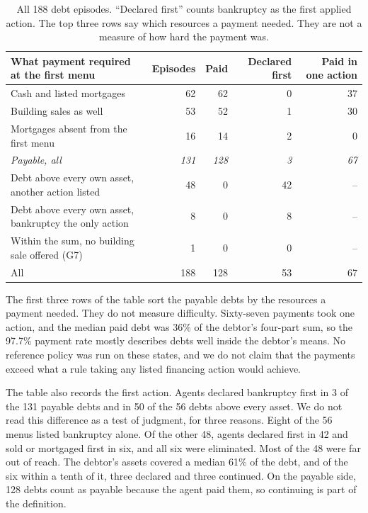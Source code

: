 \documentclass[11pt,letterpaper]{article}
\begin{document}
\begin{table}[htbp]\centering\small
\begin{tabularx}{\linewidth}{@{}Yrrrr@{}}\toprule
What payment required at the first menu & Episodes & Paid & Declared first & Paid in one action\\\midrule
Cash and listed mortgages & 62 & 62 & 0 & 37\\
Building sales as well & 53 & 52 & 1 & 30\\
Mortgages absent from the first menu & 16 & 14 & 2 & 0\\
\emph{Payable, all} & \emph{131} & \emph{128} & \emph{3} & \emph{67}\\\addlinespace
Debt above every own asset, another action listed & 48 & 0 & 42 & --\\
Debt above every own asset, bankruptcy the only action & 8 & 0 & 8 & --\\
Within the sum, no building sale offered (G7) & 1 & 0 & 0 & --\\\midrule
All & 188 & 128 & 53 & 67\\\bottomrule
\end{tabularx}
\caption{All 188 debt episodes. ``Declared first'' counts bankruptcy as the first applied action. The top three rows say which resources a payment needed. They are not a measure of how hard the payment was.}
\label{tab:debt}
\end{table}

The first three rows of the table sort the payable debts by the resources a payment needed. They do not measure difficulty. Sixty-seven payments took one action, and the median paid debt was 36\% of the debtor's four-part sum, so the 97.7\% payment rate mostly describes debts well inside the debtor's means. No reference policy was run on these states, and we do not claim that the payments exceed what a rule taking any listed financing action would achieve.

The table also records the first action. Agents declared bankruptcy first in 3 of the 131 payable debts and in 50 of the 56 debts above every asset. We do not read this difference as a test of judgment, for three reasons. Eight of the 56 menus listed bankruptcy alone. Of the other 48, agents declared first in 42 and sold or mortgaged first in six, and all six were eliminated. Most of the 48 were far out of reach. The debtor's assets covered a median 61\% of the debt, and of the six within a tenth of it, three declared and three continued. On the payable side, 128 debts count as payable because the agent paid them, so continuing is part of the definition.
\end{document}
